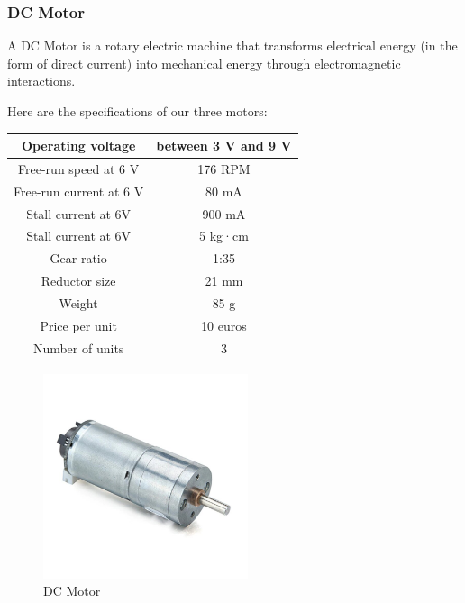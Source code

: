 \subsubsection{DC Motor}
A DC Motor is a rotary electric machine that transforms electrical energy
(in the form of direct current) into mechanical energy through electromagnetic interactions.


Here are the specifications of our three motors:

\begin{center}
    \begin{tabular}{ |c|c| }
        \hline
        Operating voltage       & between 3 V and 9 V \\
        \hline
        Free-run speed at 6 V   & 176 RPM             \\
        \hline
        Free-run current at 6 V & 80 mA               \\
        \hline
        Stall current at 6V     & 900 mA              \\
        \hline
        Stall current at 6V     & 5 kg·cm             \\
        \hline
        Gear ratio              & 1:35                \\
        \hline
        Reductor size           & 21 mm               \\
        \hline
        Weight                  & 85 g                \\
        \hline
        Price per unit          & 10 euros            \\
        \hline
        Number of units         & 3                   \\
        \hline
    \end{tabular}
\end{center}

\begin{figure}[H]
    \centering
    \includegraphics[width=6cm]{img/components/motor.jpg}
    \caption{DC Motor}
    \label{fig: DC Motor}
\end{figure}

